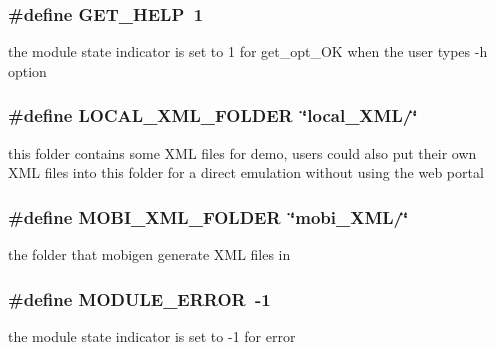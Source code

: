 \subsubsection[{GET\_\-HELP}]{\setlength{\rightskip}{0pt plus 5cm}\#define GET\_\-HELP~1}\label{group____useful__macro_g2c856490debc47ae4f902edb5c866bcb}


the module state indicator is set to 1 for get\_\-opt\_\-OK when the user types -h option 

\subsubsection[{LOCAL\_\-XML\_\-FOLDER}]{\setlength{\rightskip}{0pt plus 5cm}\#define LOCAL\_\-XML\_\-FOLDER~\char`\"{}local\_\-XML/\char`\"{}}\label{group____useful__macro_ga29ecbb8fd7fe36832a39c0b91012af0}


this folder contains some XML files for demo, users could also put their own XML files into this folder for a direct emulation without using the web portal 

\subsubsection[{MOBI\_\-XML\_\-FOLDER}]{\setlength{\rightskip}{0pt plus 5cm}\#define MOBI\_\-XML\_\-FOLDER~\char`\"{}mobi\_\-XML/\char`\"{}}\label{group____useful__macro_g9faf2b41a72484a85c3562b70f15f874}


the folder that mobigen generate XML files in 

\subsubsection[{MODULE\_\-ERROR}]{\setlength{\rightskip}{0pt plus 5cm}\#define MODULE\_\-ERROR~-1}\label{group____useful__macro_g2a02efbd4b43aa3fa0b32d7acb954f14}


the module state indicator is set to -1 for error 

